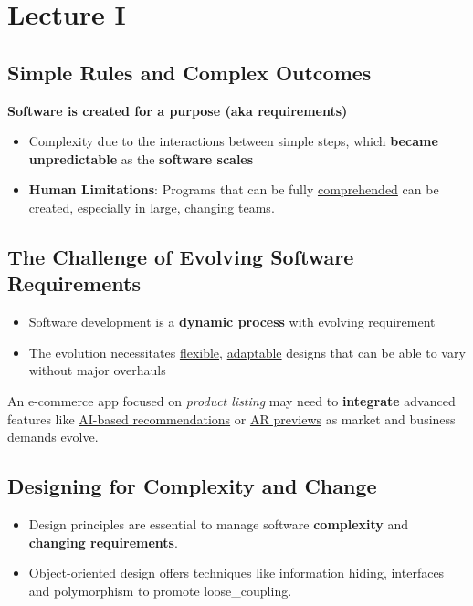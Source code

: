 \section{Lecture I}
\subsection{Simple Rules and Complex Outcomes}
\textbf{Software is created for a purpose (aka requirements)}
\begin{itemize}
    \item Complexity due to the interactions between simple steps, which \textbf{became unpredictable} as the \textbf{software scales}
    \item \textbf{Human Limitations}: Programs that can be fully \underline{comprehended} can be created, especially in \underline{large}, \underline{changing} teams.
\end{itemize}

\subsection{The Challenge of Evolving Software Requirements}
\begin{itemize}
    \item Software development is a \textbf{dynamic process} with evolving requirement

    \item The evolution necessitates \underline{flexible}, \underline{adaptable} designs that can be able to vary without major overhauls
\end{itemize}

\begin{example}
    An e-commerce app focused on \textit{product listing} may need to \textbf{integrate} advanced features like \underline{AI-based recommendations} or \underline{AR previews} as market and business demands evolve.
\end{example}

\subsection{Designing for Complexity and Change}
\begin{itemize}
    \item Design principles are essential to manage software \textbf{complexity} and \textbf{changing requirements}.
    \item Object-oriented design offers techniques like information hiding, interfaces and polymorphism to promote \gls{loose_coupling}.
\end{itemize}

